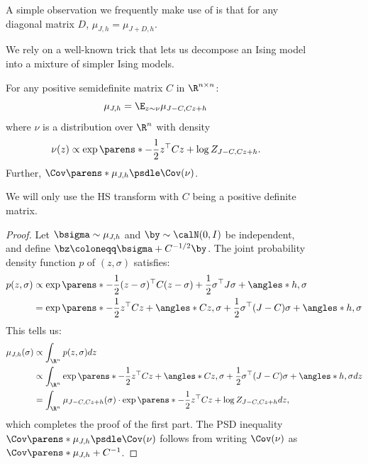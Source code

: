 \documentclass[11pt,letterpaper]{article}
\begin{document}
\begin{figure}
    \begin{observation}
        \label{obs:diag-invariant}
        A simple observation we frequently make use of is that for any diagonal matrix $D$, $\mu_{J, h} = \mu_{J+D, h}$.
    \end{observation}

    We rely on a well-known trick that lets us decompose an Ising model into a mixture of simpler Ising models.
    \begin{theorem}    \label{thm:HS}
        For any positive semidefinite matrix $C$ in $\R^{n\times n}$:
        \[
            \mu_{J, h} = \E_{z\sim\nu} \mu_{J-C, Cz+h}
        \]
        where $\nu$ is a distribution over $\R^n$ with density
        \[
            \nu(z) \propto \exp\parens*{-\frac{1}{2}z^{\top} C z + \log Z_{J-C, Cz+h}}.
        \]
        Further, $\Cov\parens*{\mu_{J, h}} \psdle \Cov(\nu)$.
    \end{theorem}
    We will only use the HS transform with $C$ being a positive definite matrix.
    \begin{proof}
        Let $\bsigma\sim\mu_{J, h}$ and $\by\sim\calN(0,I)$ be independent, and define $\bz \coloneqq \bsigma + C^{-1/2} \by$.
        The joint probability density function $p$ of $(z,\sigma)$ satisfies:
        \begin{align*}
            p(z,\sigma) &\propto \exp\parens*{-\frac{1}{2}(z-\sigma)^{\top} C (z-\sigma) + \frac{1}{2}\sigma^{\top}J\sigma + \angles*{h,\sigma}} \\
            &= \exp\parens*{ -\frac{1}{2} z^{\top} C z + \angles*{Cz,\sigma} + \frac{1}{2}\sigma^{\top} (J-C) \sigma + \angles*{h,\sigma} }
        \end{align*}
        This tells us:
        \begin{align*}
            \mu_{J,h}(\sigma) &\propto \int_{\R^n} p(z,\sigma) dz \\
            &\propto \int_{\R^n} \exp\parens*{ -\frac{1}{2} z^{\top} C z + \angles*{Cz,\sigma} + \frac{1}{2}\sigma^{\top} (J-C) \sigma + \angles*{h,\sigma} } dz \\
            &= \int_{\R^n} \mu_{J-C, Cz+h}(\sigma) \cdot \exp\parens*{ -\frac{1}{2}z^{\top}Cz + \log Z_{J-C, Cz+h} } dz,
        \end{align*}
        which completes the proof of the first part.
        The PSD inequality $\Cov\parens*{\mu_{J, h}} \psdle \Cov(\nu)$ follows from writing $\Cov(\nu)$ as $\Cov\parens*{\mu_{J, h}} + C^{-1}$.
    \end{proof}


\end{figure}
\end{document}
